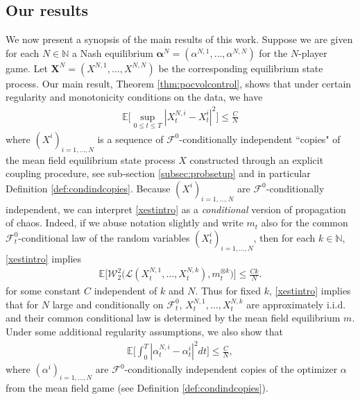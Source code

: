 \documentclass[11pt,reqno]{amsart}
\numberwithin{equation}{section}
\theoremstyle{definition}
\def\E{{\mathbb E}}
\def\N{{\mathbb N}}
\newcommand{\bX}{\mathbf{X}}
\newcommand{\sL}{\mathcal{L}}
\newcommand{\sF}{\mathcal{F}}
\newcommand\cW{\mathcal W}
\def \E{\mathbb{E}}
\def \N{\mathbb{N}}
\begin{document}
\subsection{Our results}
We now present a synopsis of the main results of this work.
Suppose we are given for each $N \in \N$ a Nash equilibrium $\bm \alpha^N = (\alpha^{N,1},\dots,\alpha^{N,N})$ for the $N$-player game. Let $\bX^N = (X^{N,1},\dots,X^{N,N})$ be the corresponding equilibrium state process.
Our main result, Theorem \ref{thm:pocvolcontrol}, shows that under certain regularity and monotonicity conditions on the data, we have 
\begin{align} \label{xestintro}
\E\Big[ \sup_{0 \leq t \leq T} |X_t^{N,i} - X_t^i|^2 \Big] \leq \frac{C}{N} 
\end{align}
where $(X^i)_{i = 1,\dots,N}$ is a sequence of $\sF^0$-conditionally independent ``copies" of the mean field equilibrium state process $X$ constructed through an explicit coupling procedure, see sub-section \ref{subsec:probsetup} and in particular Definition \ref{def:condindcopies}. Because $(X^i)_{i = 1,\dots,N}$ are $\sF^0$-conditionally independent, we can interpret \eqref{xestintro} as a \textit{conditional} version of propagation of chaos. Indeed, if we abuse notation slightly and write $m_t$ also for the common $\sF_t^0$-conditional law of the random variables $(X^i_t)_{i = 1,\dots,N}$, then for each $k \in \N$, \eqref{xestintro} implies
\begin{align} \label{wassestintro}
\E\bigg[\cW_2^2\Big( \sL(X_t^{N,1},\dots,X_t^{N,k}), m_t^{\otimes k}\Big) \bigg] \leq \frac{Ck}{N}.
\end{align}
for some constant $C$ independent of $k$ and $N$.
Thus for fixed $k$, \eqref{xestintro} implies that for $N$ large and conditionally on $\sF_t^0$, $X_t^{N,1},\dots,X_t^{N,k}$ are approximately i.i.d. and their common conditional law is determined by the mean field equilibrium $m$. Under some additional regularity assumptions, we also show that
\begin{align} \label{alphaestintro}
\E\bigg[ \int_0^T |\alpha_t^{N,i} - \alpha_t^i|^2 dt\bigg] \leq \frac{C}{N}, 
\end{align}
where $(\alpha^i)_{i = 1,\dots,N}$ are $\sF^0$-conditionally independent copies of the optimizer $\alpha$ from the mean field game (see Definition \ref{def:condindcopies}). 
\end{document}
